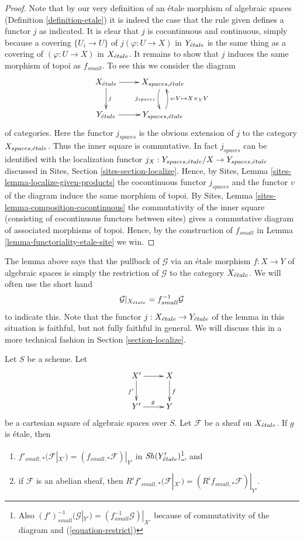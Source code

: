 \begin{proof}
Note that by our very definition of an \'etale morphism of algebraic spaces
(Definition \ref{definition-etale}) it is
indeed the case that the rule given defines a functor $j$ as indicated.
It is clear that $j$ is cocontinuous and continuous, simply because a covering
$\{U_i \to U\}$ of $j(\varphi : U \to X)$ in $Y_{\acute{e}tale}$ is the
same thing as a covering of $(\varphi : U \to X)$ in $X_{\acute{e}tale}$. It
remains to show that $j$ induces the same morphism of topoi as $f_{small}$.
To see this we consider the diagram
$$
\xymatrix{
X_\etale \ar[r] \ar[d]^j &
X_{spaces, \etale} \ar@/_/[d]_{j_{spaces}} \\
Y_\etale \ar[r] &
Y_{spaces, \etale} \ar@/_/[u]_{v : V \mapsto X \times_Y V}
}
$$
of categories. Here the functor $j_{spaces}$ is the obvious extension of $j$
to the category $X_{spaces, {\acute{e}tale}}$. Thus the inner square is
commutative. In fact $j_{spaces}$ can be identified with the
localization functor
$j_X : Y_{spaces, {\acute{e}tale}}/X \to Y_{spaces, {\acute{e}tale}}$
discussed in
Sites, Section \ref{sites-section-localize}.
Hence, by
Sites, Lemma \ref{sites-lemma-localize-given-products}
the cocontinuous functor $j_{spaces}$ and the functor $v$ of the diagram
induce the same morphism of topoi. By
Sites, Lemma \ref{sites-lemma-composition-cocontinuous}
the commutativity of the inner square (consisting of cocontinuous functors
between sites) gives a commutative diagram of associated morphisms of topoi.
Hence, by the construction of $f_{small}$ in
Lemma \ref{lemma-functoriality-etale-site} we win.
\end{proof}

\noindent
The lemma above says that the pullback of $\mathcal{G}$ via an \'etale morphism
$f : X \to Y$ of algebraic spaces is simply the restriction of $\mathcal{G}$
to the category $X_{\acute{e}tale}$. We will often use the short hand
\begin{equation}
\label{equation-restrict}
\mathcal{G}|_{X_{\acute{e}tale}} = f_{small}^{-1}\mathcal{G}
\end{equation}
to indicate this. Note that the functor
$j : X_{\acute{e}tale} \to Y_{\acute{e}tale}$
of the lemma in this situation is faithful, but not fully faithful in
general. We will discuss this in a more technical fashion in
Section \ref{section-localize}.

\begin{lemma}
\label{lemma-pushforward-etale-base-change}
Let $S$ be a scheme. Let
$$
\xymatrix{
X' \ar[r] \ar[d]_{f'} & X \ar[d]^f \\
Y' \ar[r]^g & Y
}
$$
be a cartesian square of algebraic spaces over $S$. Let
$\mathcal{F}$ be a sheaf on $X_{\acute{e}tale}$. If $g$ is \'etale, then
\begin{enumerate}
\item $f'_{small, *}(\mathcal{F}|_{X'}) = (f_{small, *}\mathcal{F})|_{Y'}$
in $\mathop{\mathit{Sh}}\nolimits(Y'_{\acute{e}tale})$\footnote{Also
$(f')_{small}^{-1}(\mathcal{G}|_{Y'}) = (f_{small}^{-1}\mathcal{G})|_{X'}$
because of commutativity of the diagram and (\ref{equation-restrict})}, and
\item if $\mathcal{F}$ is an abelian sheaf, then
$R^if'_{small, *}(\mathcal{F}|_{X'}) = (R^if_{small, *}\mathcal{F})|_{Y'}$.
\end{enumerate}
\end{lemma}


